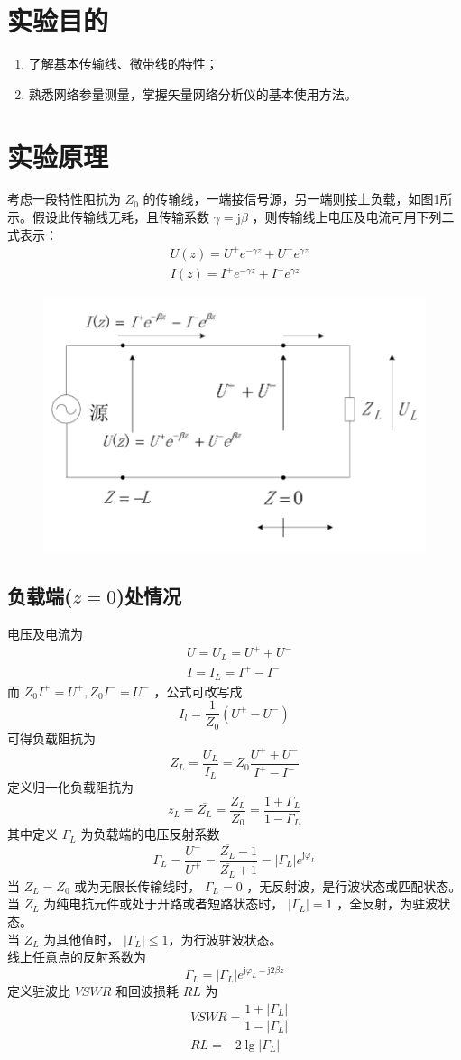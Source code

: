\documentclass{source/Report}
\title{}
\date{2023年3月28日}
\begin{document}
\makecover
\makeheader
\section{实验目的}
\begin{enumerate}[label={\arabic*.}]
    \item 了解基本传输线、微带线的特性；
    \item 熟悉网络参量测量，掌握矢量网络分析仪的基本使用方法。
\end{enumerate}

\section{实验原理}
考虑一段特性阻抗为 $Z_0$ 的传输线，一端接信号源，另一端则接上负载，如图1所示。假设此传输线无耗，且传输系数 $\gamma=\text{j}\beta$ ，则传输线上电压及电流可用下列二式表示：
\begin{align*}
     & U(z)=U^+e^{-\gamma z}+U^-e^{\gamma z} \\
     & I(z)=I^+e^{-\gamma z}+I^-e^{\gamma z}
\end{align*}
\begin{figure}[H]
    \begin{center}
        \includegraphics[width=0.4\linewidth]{pic/cb1_p1.png}
        \caption{}
    \end{center}
\end{figure}
\subsection{负载端($z=0$)处情况}
电压及电流为
\begin{align*}
     & U=U_L=U^++U^- \\
     & I=I_L=I^+-I^-
\end{align*}
而 $Z_0I^+=U^+,Z_0I^-=U^-$ ，公式可改写成
$$I_l=\dfrac{1}{Z_0}(U^+-U^-)$$
可得负载阻抗为
$$Z_L=\dfrac{U_L}{I_L}=Z_0\dfrac{U^++U^-}{I^+-I^-}$$
定义归一化负载阻抗为
$$z_L=\overline{Z_L}=\dfrac{Z_L}{Z_0}=\dfrac{1+\Gamma_L}{1-\Gamma_L}$$
其中定义 $\Gamma_L$ 为负载端的电压反射系数
$$\Gamma_L=\dfrac{U^-}{U^+}=\dfrac{\overline{Z_L}-1}{\overline{Z_L}+1}=|\Gamma_L|e^{\text{j}\varphi_L}$$
当 $Z_L=Z_0$ 或为无限长传输线时， $\Gamma_L=0$ ，无反射波，是行波状态或匹配状态。\\
当 $Z_L$ 为纯电抗元件或处于开路或者短路状态时， $|\Gamma_L|=1$ ，全反射，为驻波状态。\\
当 $Z_L$ 为其他值时， $|\Gamma_L|\leq 1$，为行波驻波状态。\\
线上任意点的反射系数为
$$\Gamma_L=|\Gamma_L|e^{\text{j}\varphi_L-\text{j}2\beta z}$$
定义驻波比 $VSWR$ 和回波损耗 $RL$ 为
\begin{align*}
     & VSWR=\dfrac{1+|\Gamma_L|}{1-|\Gamma_L|} \\
     & RL=-2\lg{|\Gamma_L|}
\end{align*}
\end{document}
